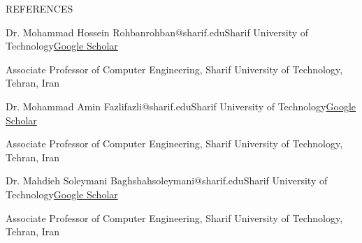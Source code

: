 \documentclass[]{CV}
\begin{document}
\begin{section}{REFERENCES}
\begin{subsectionnobullet}{Dr. Mohammad Hossein Rohban}{rohban@sharif.edu}{Sharif University of Technology}{\href{https://scholar.google.com/citations?user=pRyJ6FkAAAAJ&hl=en}{Google Scholar}}
    \item {Associate Professor of Computer Engineering, Sharif University of Technology, Tehran, Iran}
\end{subsectionnobullet}

\begin{subsectionnobullet}{Dr. Mohammad Amin Fazli}{fazli@sharif.edu}{Sharif University of Technology}{\href{https://scholar.google.com/citations?user=veo-8swAAAAJ&hl=en}{Google Scholar}}
    \item {Associate Professor of Computer Engineering, Sharif University of Technology, Tehran, Iran}
\end{subsectionnobullet}

\begin{subsectionnobullet}{Dr. Mahdieh Soleymani Baghshah}{soleymani@sharif.edu}{Sharif University of Technology}{\href{https://scholar.google.com/citations?user=S1U0KlgAAAAJ}{Google Scholar}}
    \item {Associate Professor of Computer Engineering, Sharif University of Technology, Tehran, Iran}
\end{subsectionnobullet}
\end{section}
\end{document}

